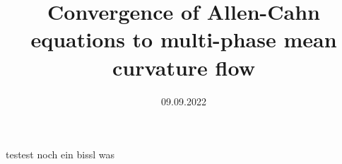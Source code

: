 \documentclass[a4paper, 10pt, bibliogrpahy = totocnumbered]{scrbook}
\date{09.09.2022}
\title{Convergence of Allen-Cahn equations to multi-phase mean curvature flow}
\begin{document}
	
\frontmatter	

	\maketitle
	\tableofcontents
	
\mainmatter	
	testest noch ein bissl was
	
\appendix

\backmatter

	
\end{document}
